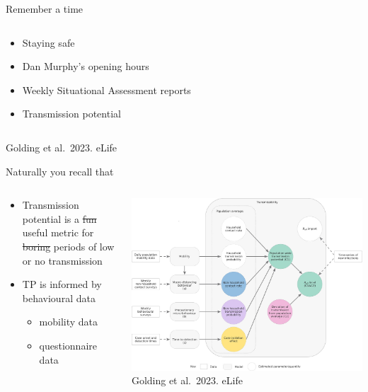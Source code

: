 \documentclass[
  ignorenonframetext,
  aspectratio=149,
]{beamer}
\providecommand{\tightlist}{%
  \setlength{\itemsep}{0pt}\setlength{\parskip}{0pt}}\usepackage{longtable,booktabs,array}
\begin{document}
\begin{frame}{Remember a time}
\begin{columns}[T]
\begin{column}{0.3\textwidth}
\begin{itemize}
\tightlist
\item
  Staying safe
\item
  Dan Murphy's opening hours
\item
  Weekly Situational Assessment reports
\item
  Transmission potential
\end{itemize}
\end{column}
\end{columns}

Golding et al.~2023. eLife
\end{frame}

\begin{frame}{Naturally you recall that}
\label{naturally-you-recall-that}
\begin{columns}[T]
\begin{column}{0.4\textwidth}
\begin{itemize}
\tightlist
\item
  Transmission potential is a \st{fun} useful metric for \st{boring}
  periods of low or no transmission
\item
  TP is informed by behavioural data

  \begin{itemize}
  \tightlist
  \item
    mobility data
  \item
    questionnaire data
  \end{itemize}
\end{itemize}
\end{column}

\begin{column}{0.7\textwidth}
\includegraphics{images/tp_model_schema.jpg} Golding et al.~2023. eLife
\end{column}
\end{columns}
\end{frame}
\end{document}
